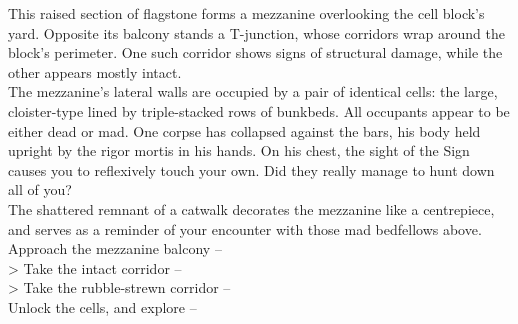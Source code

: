 This raised section of flagstone forms a mezzanine overlooking the cell block’s yard. Opposite its balcony stands a T-junction, whose corridors wrap around the block’s perimeter. One such corridor shows signs of structural damage, while the other appears mostly intact.\\

The mezzanine's lateral walls are occupied by a pair of identical cells: the large, cloister-type lined by triple-stacked rows of bunkbeds. All occupants appear to be either dead or mad. One corpse has collapsed against the bars, his body held upright by the rigor mortis in his hands. On his chest, the sight of the Sign causes you to reflexively touch your own. Did they really manage to hunt down all of you?\\

The shattered remnant of a catwalk decorates the mezzanine like a centrepiece, and serves as a reminder of your encounter with those mad bedfellows above.\\

 Approach the mezzanine balcony -- \\
> Take the intact corridor -- \\
> Take the rubble-strewn corridor -- \\
 Unlock the cells, and explore -- 